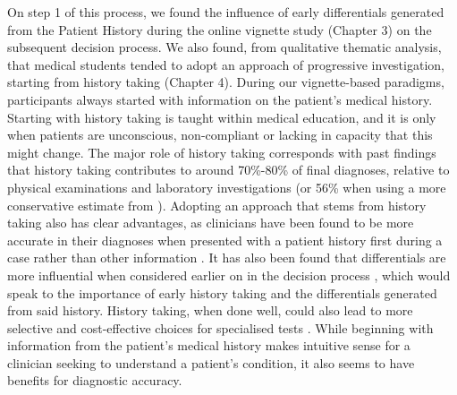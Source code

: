 \documentclass[a4paper, nobind]{templates/ociamthesis}
\begin{document}
On step 1 of this process, we found the influence of early differentials generated from the Patient History during the online vignette study (Chapter 3) on the subsequent decision process. We also found, from qualitative thematic analysis, that medical students tended to adopt an approach of progressive investigation, starting from history taking (Chapter 4). During our vignette-based paradigms, participants always started with information on the patient's medical history. Starting with history taking is taught within medical education, and it is only when patients are unconscious, non-compliant or lacking in capacity that this might change. The major role of history taking corresponds with past findings that history taking contributes to around 70\%-80\% of final diagnoses, relative to physical examinations and laboratory investigations \autocite{hampton_relative_1975,peterson_contributions_1992,tsukamoto_contribution_2012} (or 56\% when using a more conservative estimate from \textcite{sandler_importance_1980}). Adopting an approach that stems from history taking also has clear advantages, as clinicians have been found to be more accurate in their diagnoses when presented with a patient history first during a case rather than other information \autocite{tio_effect_2022}. It has also been found that differentials are more influential when considered earlier on in the decision process \autocite{kourtidis_influences_2022}, which would speak to the importance of early history taking and the differentials generated from said history. History taking, when done well, could also lead to more selective and cost-effective choices for specialised tests \autocite{muhrer_importance_2014}. While beginning with information from the patient's medical history makes intuitive sense for a clinician seeking to understand a patient's condition, it also seems to have benefits for diagnostic accuracy.\\
\end{document}
